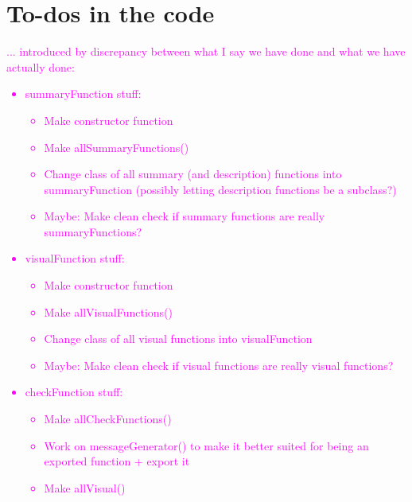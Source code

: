 \documentclass[article]{jss}
\newcommand{\hl}[1]{\textcolor{magenta}{#1}}
\begin{document}
\section{To-dos in the code}
\hl{ ...  introduced by discrepancy between what I say we have done and what we have actually done:
\begin{itemize}
\item summaryFunction stuff:
	\begin{itemize}
		\item Make constructor function
		\item Make allSummaryFunctions()
		\item Change class of all summary (and description) functions into summaryFunction (possibly letting description functions be a subclass?)
		\item Maybe: Make clean check if summary functions are really summaryFunctions?
	\end{itemize}
\item visualFunction stuff:
	\begin{itemize}
		\item Make constructor function
		\item Make allVisualFunctions()
		\item Change class of all visual functions into visualFunction
		\item Maybe: Make clean check if visual functions are really visual functions?
	\end{itemize}
\item checkFunction stuff:
	\begin{itemize}
		\item Make allCheckFunctions()
		\item Work on messageGenerator() to make it better suited for being an exported function + export it
		\item Make allVisual()
	\end{itemize}
\end{itemize}
}
\end{document}

